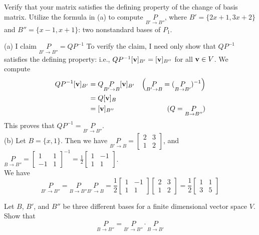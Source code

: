 Verify that your matrix satisfies the defining property of the change of basis matrix. 
\ii Utilize the formula in (a) to compute $\underset{B'\rightarrow B''}{P}$, where $B'=\{2x+1, 3x+2\}$ and $B''=\{x-1,x+1\}$: two nonstandard bases of $P_1$. 
\ee
\begin{solution}
\noindent (a) I claim $\underset{B'\rightarrow B''}{P}=QP^{-1}$ To verify the claim, I need only show that $QP^{-1}$ satisfies the defining property: i.e., $QP^{-1}[{\mathbf v}]_{B'}=[{\mathbf v}]_{B''}$ for all ${\mathbf v}\in V$. We compute
\begin{align*}
QP^{-1}[{\mathbf v}]_{B'}&=Q\underset{B'\rightarrow B}{P}[{\mathbf v}]_{B'} &\left(\underset{B'\rightarrow B}{P}=(\underset{B\rightarrow B'}{P})^{-1}\right)\\
&=Q[{\mathbf v}]_{B}\\
&=[{\mathbf v}]_{B''} &(Q=\underset{B\rightarrow B''}{P})
\end{align*}
This proves that $QP^{-1}=\underset{B'\rightarrow B''}{P}$. 
\vspace{.1in}
\\
(b) Let $B=\{x, 1\}$. Then we have $\underset{B'\rightarrow B}{P}=\begin{bmatrix}
2&3\\
1&2
\end{bmatrix}$, and $\underset{B\rightarrow B''}{P}=\begin{bmatrix}
1&1\\
-1&1
\end{bmatrix}^{-1}=\frac{1}{2}\begin{bmatrix}
1&-1\\
1&1
\end{bmatrix}$. 
\\
We have 
\[
\underset{B'\rightarrow B''}{P}=\underset{B\rightarrow B''}{P}\underset{B'\rightarrow B}{P}=\frac{1}{2}\begin{bmatrix}
1&-1\\
1&1
\end{bmatrix}
\begin{bmatrix}
2&3\\
1&2
\end{bmatrix}
=\frac{1}{2}\begin{bmatrix}
1&1\\
3&5
\end{bmatrix}
\]
\end{solution}
\ii Let $B$, $B'$, and $B''$ be three different bases for a finite dimensional vector space $V$. Show that 
\[
\underset{B\rightarrow B''}{P}=\underset{B'\rightarrow B''}{P}\cdot \underset{B\rightarrow B'}{P} 
\]
